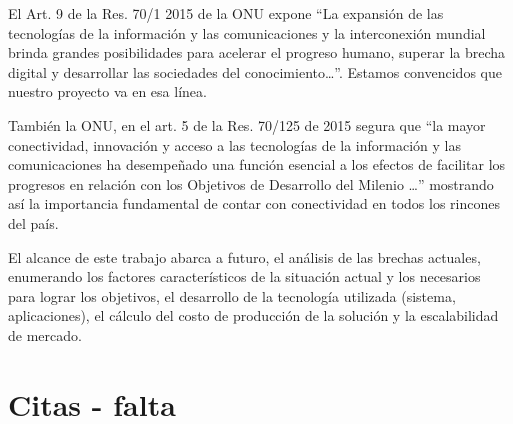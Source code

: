 \documentclass[a4paper]{article}
\begin{document}
El Art. 9 de la Res. 70/1 2015 de la ONU expone “La expansión de las tecnologías de la información y las comunicaciones y la interconexión mundial brinda grandes posibilidades para acelerar el progreso humano, superar la brecha digital y desarrollar las sociedades del conocimiento…”. Estamos convencidos que nuestro proyecto va en esa línea. 

También la ONU, en el art. 5 de la Res. 70/125  de 2015 segura que “la mayor conectividad, innovación y acceso a las tecnologías de la información y las comunicaciones ha desempeñado una función esencial a los efectos de facilitar los progresos en relación con los Objetivos de Desarrollo del Milenio …” mostrando así la importancia fundamental de contar con conectividad en todos los rincones del país. 

El alcance de este trabajo abarca a futuro, el análisis de las brechas actuales, enumerando los factores característicos de la situación actual y los necesarios para lograr los objetivos, el desarrollo de la tecnología utilizada (sistema, aplicaciones), el cálculo del costo de producción de la solución y la escalabilidad de mercado.

\section{Citas - falta}

%
%
\end{document}
